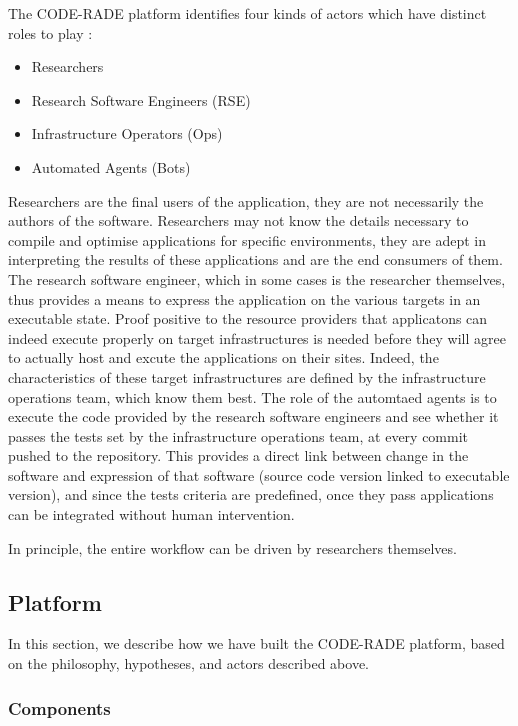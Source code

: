 \documentclass[a4paper]{jpconf}
\begin{document}
	The CODE-RADE platform identifies four kinds of actors which have distinct roles to play :
	\begin{itemize}
		\item Researchers
		\item Research Software Engineers (RSE)
		\item Infrastructure Operators (Ops)
		\item Automated Agents (Bots)
	\end{itemize}

    Researchers are the final users of the application, they are not necessarily the authors of
    the software. Researchers may not know the details necessary to compile and optimise
    applications for specific environments, they are adept in interpreting the results of
    these applications and are the end consumers of them. The research software engineer, which in
    some cases is the researcher themselves, thus provides a means to express the application on the
    various targets in an executable state. Proof positive to the resource providers that
    applicatons can indeed execute properly on target infrastructures is needed before they will
    agree to actually host and excute the applications on their sites. Indeed, the characteristics
    of these target infrastructures are defined by the infrastructure operations team, which know
    them best. The role of the automtaed agents is to execute the code provided by the research
    software engineers and see whether it passes the tests set by the infrastructure operations
    team, at every commit pushed to the repository. This provides a direct link between change in
    the software and expression of that software (source code version linked to executable version),
    and since the tests criteria are predefined, once they pass applications can be integrated
    without human intervention.

	In principle, the entire workflow can be driven by researchers themselves.

	\subsection{Platform}

    In this section, we describe how we have built the CODE-RADE platform, based on the philosophy,
    hypotheses, and actors described above.

	\subsubsection{Components}
\end{document}
